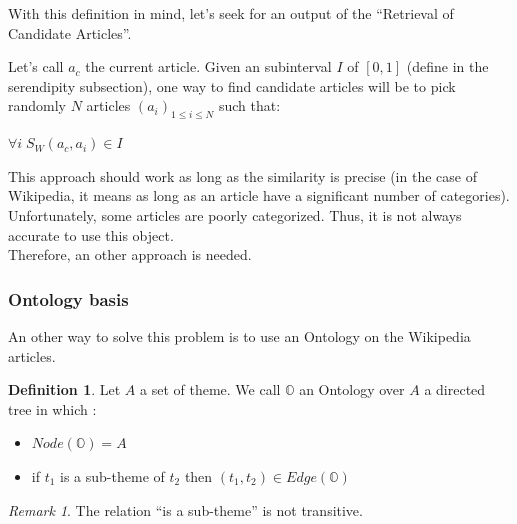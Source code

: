\documentclass[11pt]{article}
\theoremstyle{plain}
\theoremstyle{definition}
\newtheorem{defn}{Definition}[section]
\theoremstyle{remark}
\newtheorem*{rem}{Remark}
\begin{document}
\vspace*{5mm}
With this definition in mind, let's seek for an output of the ``Retrieval of Candidate Articles''.


Let's call $a_c$ the current article.
Given an subinterval $I$ of $[0,1]$ (define in the serendipity subsection), one way to find candidate articles will be to pick randomly $N$ articles $(a_i)_{1 \leq i \leq N}$ such that:
\begin{center}
  $\forall i \; S_W(a_c,a_i) \in I$
\end{center}

\vspace*{5mm}
This approach should work as long as the similarity is precise (in the case of Wikipedia, it means as long as an article have a significant number of categories). Unfortunately, some articles are poorly categorized. Thus, it is not always accurate to use this object.\\
Therefore, an other approach is needed.






\subsubsection{Ontology basis}

An other way to solve this problem is to use an Ontology on the Wikipedia articles.

\vspace*{5mm}
\begin{defn}
  Let $A$ a set of theme. We call $\mathbb{O}$ an Ontology over $A$ a directed tree in which :
  \begin{itemize}
  \item $ Node(\mathbb{O}) = A$
  \item if $t_1$ is a sub-theme of $t_2$ then $(t_1,t_2) \in Edge(\mathbb{O})$
  \end{itemize}
\end{defn}

\vspace*{5mm}

\begin{rem}
  The relation ``is a sub-theme'' is not transitive.
\end{rem}
\end{document}
